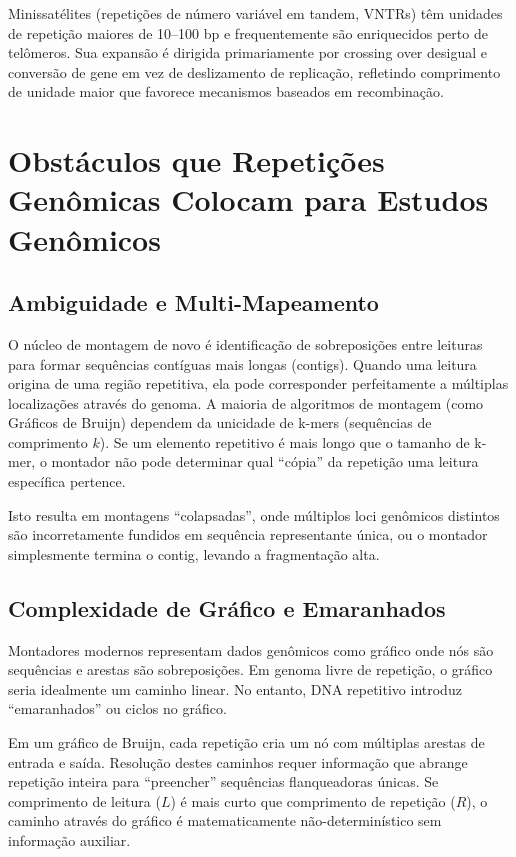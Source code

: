 Minissatélites (repetições de número variável em tandem, VNTRs) têm unidades de repetição maiores de 10--100 bp e frequentemente são enriquecidos perto de telômeros. Sua expansão é dirigida primariamente por crossing over desigual e conversão de gene em vez de deslizamento de replicação, refletindo comprimento de unidade maior que favorece mecanismos baseados em recombinação.

\section{Obstáculos que Repetições Genômicas Colocam para Estudos Genômicos}

\subsection{Ambiguidade e Multi-Mapeamento}

O núcleo de montagem de novo é identificação de sobreposições entre leituras para formar sequências contíguas mais longas (contigs). Quando uma leitura origina de uma região repetitiva, ela pode corresponder perfeitamente a múltiplas localizações através do genoma. A maioria de algoritmos de montagem (como Gráficos de Bruijn) dependem da unicidade de k-mers (sequências de comprimento $k$). Se um elemento repetitivo é mais longo que o tamanho de k-mer, o montador não pode determinar qual ``cópia'' da repetição uma leitura específica pertence.

Isto resulta em montagens ``colapsadas'', onde múltiplos loci genômicos distintos são incorretamente fundidos em sequência representante única, ou o montador simplesmente termina o contig, levando a fragmentação alta.

\subsection{Complexidade de Gráfico e Emaranhados}

Montadores modernos representam dados genômicos como gráfico onde nós são sequências e arestas são sobreposições. Em genoma livre de repetição, o gráfico seria idealmente um caminho linear. No entanto, DNA repetitivo introduz ``emaranhados'' ou ciclos no gráfico.

Em um gráfico de Bruijn, cada repetição cria um nó com múltiplas arestas de entrada e saída. Resolução destes caminhos requer informação que abrange repetição inteira para ``preencher'' sequências flanqueadoras únicas. Se comprimento de leitura ($L$) é mais curto que comprimento de repetição ($R$), o caminho através do gráfico é matematicamente não-determinístico sem informação auxiliar.

